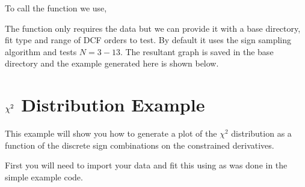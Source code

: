 \documentclass[letterpaper,10pt,english]{sphinxmanual}
\let\sphinxpxdimen\pdfpxdimen\else\newdimen\sphinxpxdimen
\begin{document}
\begin{sphinxVerbatim}[commandchars=\\\{\}]
   
\end{sphinxVerbatim}

To call the function we use,

\begin{sphinxVerbatim}[commandchars=\\\{\}]
  
\end{sphinxVerbatim}

The function only requires the data but we can provide it with a base directory,
fit type and range of DCF orders to test. By default it uses the sign sampling
algorithm and tests \({N = 3 - 13}\). The resultant graph is saved in the
base directory and the example generated here is shown below.

\noindent{\hspace*{\fill}\sphinxincludegraphics[width=400\sphinxpxdimen]{{Basis_functions}.png}\hspace*{\fill}}


\section{\protect\({\chi^2}\protect\) Distribution Example}
\label{\detokenize{source/maxsmooth:chi-2-distribution-example}}
This example will show you how to generate a plot of the \({\chi^2}\)
distribution as a function of the discrete sign combinations on the constrained
derivatives.

First you will need to import your data and fit this using  as
was done in the simple example code.

\begin{sphinxVerbatim}[commandchars=\\\{\}]
   

  
  

   

  
     
   
\end{sphinxVerbatim}
\end{document}
